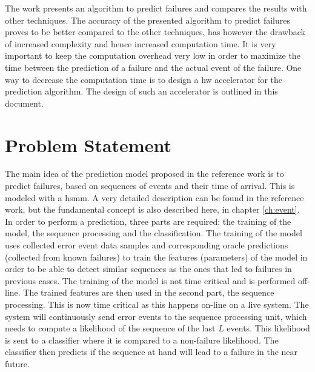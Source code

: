 \documentclass[mscthesis]{usiinfthesis}
\begin{document}
The work \cite{salfner08} presents an algorithm to predict failures and
compares the results with other techniques. The accuracy of the presented
algorithm to predict failures proves to be better compared to the other
techniques, has however the drawback of increased complexity and hence
increased computation time. It is very important to keep the computation
overhead very low in order to maximize the time between the prediction of
a failure and the actual event of the failure. One way to decrease the
computation time is to design a \gls{hw} accelerator for the prediction
algorithm. The design of such an accelerator is outlined in this document.

\section{Problem Statement}
\label{ch:_intro_prob}

The main idea of the prediction model proposed in the reference work
\cite{salfner08} is to predict failures, based on sequences of events and their
time of arrival. This is modeled with a \gls{hsmm}. A very detailed description
can be found in the reference work, but the fundamental concept is also
described here, in chapter \ref{ch:event}. In order to perform a prediction,
three parts are required: the training of the model, the sequence processing
and the classification. The training of the model uses collected error event
data samples and corresponding oracle predictions (collected from known
failures) to train the features (parameters) of the model in order to be able
to detect similar sequences as the ones that led to failures in previous cases.
The training of the model is not time critical and is performed off-line. The
trained features are then used in the second part, the sequence processing.
This is now time critical as this happens on-line on a live system. The system
will continuously send error events to the sequence processing unit, which
needs to compute a likelihood of the sequence of the last $L$ events. This
likelihood is sent to a classifier where it is compared to a non-failure
likelihood. The classifier then predicts if the sequence at hand will lead to
a failure in the near future.
\end{document}
